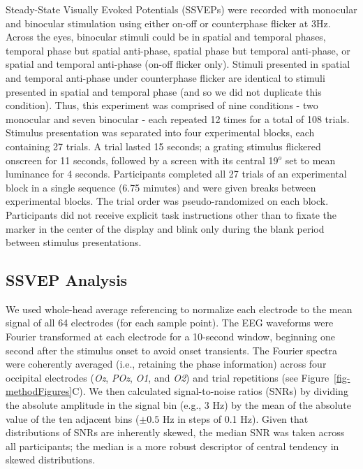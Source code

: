 \documentclass[
  12pt,
]{article}
\begin{document}
Steady-State Visually Evoked Potentials (SSVEPs) were recorded with
monocular and binocular stimulation using either on-off or counterphase
flicker at 3Hz. Across the eyes, binocular stimuli could be in spatial
and temporal phases, temporal phase but spatial anti-phase, spatial
phase but temporal anti-phase, or spatial and temporal anti-phase
(on-off flicker only). Stimuli presented in spatial and temporal
anti-phase under counterphase flicker are identical to stimuli presented
in spatial and temporal phase (and so we did not duplicate this
condition). Thus, this experiment was comprised of nine conditions - two
monocular and seven binocular - each repeated 12 times for a total of
108 trials. Stimulus presentation was separated into four experimental
blocks, each containing 27 trials. A trial lasted 15 seconds; a grating
stimulus flickered onscreen for 11 seconds, followed by a screen with
its central 19\(^o\) set to mean luminance for 4 seconds. Participants
completed all 27 trials of an experimental block in a single sequence
(6.75 minutes) and were given breaks between experimental blocks. The
trial order was pseudo-randomized on each block. Participants did not
receive explicit task instructions other than to fixate the marker in
the center of the display and blink only during the blank period between
stimulus presentations.

\subsection{SSVEP Analysis}\label{ssvep-analysis}

We used whole-head average referencing to normalize each electrode to
the mean signal of all 64 electrodes (for each sample point). The EEG
waveforms were Fourier transformed at each electrode for a 10-second
window, beginning one second after the stimulus onset to avoid onset
transients. The Fourier spectra were coherently averaged (i.e.,
retaining the phase information) across four occipital electrodes
(\emph{Oz}, \emph{POz}, \emph{O1}, and \emph{O2}) and trial repetitions
(see Figure~\ref{fig-methodFigures}C). We then calculated
signal-to-noise ratios (SNRs) by dividing the absolute amplitude in the
signal bin (e.g., 3 Hz) by the mean of the absolute value of the ten
adjacent bins (\(\pm 0.5\) Hz in steps of 0.1 Hz). Given that
distributions of SNRs are inherently skewed, the median SNR was taken
across all participants; the median is a more robust descriptor of
central tendency in skewed distributions.
\end{document}

